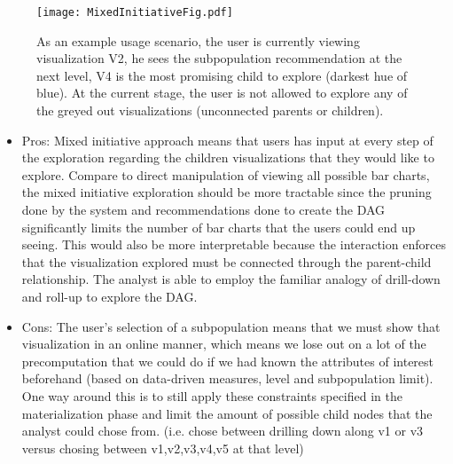  \begin{figure}[ht!]
\texttt{[image: MixedInitiativeFig.pdf]}
\caption{As an example usage scenario, the user is currently viewing visualization V2, he sees the subpopulation recommendation at the next level, V4 is the most promising child to explore (darkest hue of blue). At the current stage, the user is not allowed to explore any of the greyed out visualizations (unconnected parents or children).}

\end{figure}
 \begin{itemize}
 \item Pros: Mixed initiative approach means that users has input at every step of the exploration regarding the children visualizations that they would like to explore. Compare to direct manipulation of viewing all possible bar charts, the mixed initiative exploration should be more tractable since the pruning done by the system and recommendations done to create the DAG significantly limits the number of bar charts that the users could end up seeing. This would also be more interpretable because the interaction enforces that the visualization explored must be connected through the parent-child relationship. The analyst is able to employ the familiar analogy of drill-down and roll-up to explore the DAG.
 \item Cons: The user's selection of a subpopulation means that we must show that visualization in an online manner, which means we lose out on a lot of the precomputation that we could do if we had known the attributes of interest beforehand (based on data-driven measures, level and subpopulation limit). One way around this is to still apply these constraints specified in the materialization phase and limit the amount of possible child nodes that the analyst could chose from. (i.e. chose between drilling down along v1 or v3 versus chosing between v1,v2,v3,v4,v5 at that level)
 \end{itemize}




